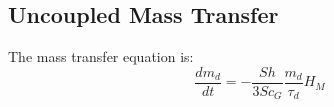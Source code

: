 \documentclass[../Interim_Report_Master]{subfiles}
\begin{document}
%


\newpage

\subsection{Uncoupled Mass Transfer}
The mass transfer equation is:
\begin{equation}
\frac{dm_d}{dt} = -\frac{Sh}{3Sc_G}\frac{m_d}{\tau_d}H_M
\label{mass3}
\end{equation}

%
\end{document}
